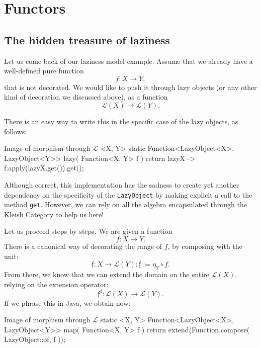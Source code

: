 \documentclass[12pt,a4paper]{report}
\renewcommand{\baselinestretch}{1.5}
\theoremstyle{theorem}
\theoremstyle{definition}
\begin{document}
\renewcommand{\baselinestretch}{1.5} 
\selectfont

\chapter{Functors}

\section{The hidden treasure of laziness}

Let us come back of our laziness model example.
Assume that we already have a well-defined pure function
	\[ f : X\to Y, \]
that is not decorated. We would like to push it through lazy objects
(or any other kind of decoration we discussed above),
as a function
	\[ \mathcal{L}(X) \to \mathcal{L}(Y) .\]

There is an easy way to write this in the specific case of 
the lazy objects, as follows:

\renewcommand{\baselinestretch}{1} 
\selectfont

\begin{javacode}{Image of morphism through $\mathcal{L}$}
  <X, Y> static Function<LazyObject<X>, LazyObject<Y>> lazy(
    Function<X, Y> f
  ) {
    return lazyX -> f.apply(lazyX.get()).get();
  }
\end{javacode}

\renewcommand{\baselinestretch}{1.5} 
\selectfont

Although correct, this implementation has the sadness to
create yet another dependency on the specificity of the \lstinline{LazyObject}{}
by making explicit a call to the method \lstinline{get}{}.
However, we can rely on all the algebra encapsulated through the Kleisli
Category to help us here!

Let us proceed steps by steps. We are given a function
	\[ f : X\to Y .\]
There is a canonical way of decorating the range of $f$,
by composing with the unit:
	\[ \mathfrak{f} : X\to\mathcal{L}(Y):
		\mathfrak{f} := \eta_Y\circ f .\]
From there, we know that we can extend the domain on the entire
$\mathcal{L}(X)$, relying on the extension operator:
	\[ \mathfrak{f}^\sharp : \mathcal{L}(X)\to\mathcal{L}(Y) .\]
If we phrase this in Java, we obtain now:

\renewcommand{\baselinestretch}{1} 
\selectfont

\begin{javacode}{Image of morphism through $\mathcal{L}$}
  static <X, Y> Function<LazyObject<X>, LazyObject<Y>> map(
    Function<X, Y> f
  ) {
    return extend(Function.compose(
      LazyObject::of, f
    ));
  }
\end{javacode}
\end{document}
